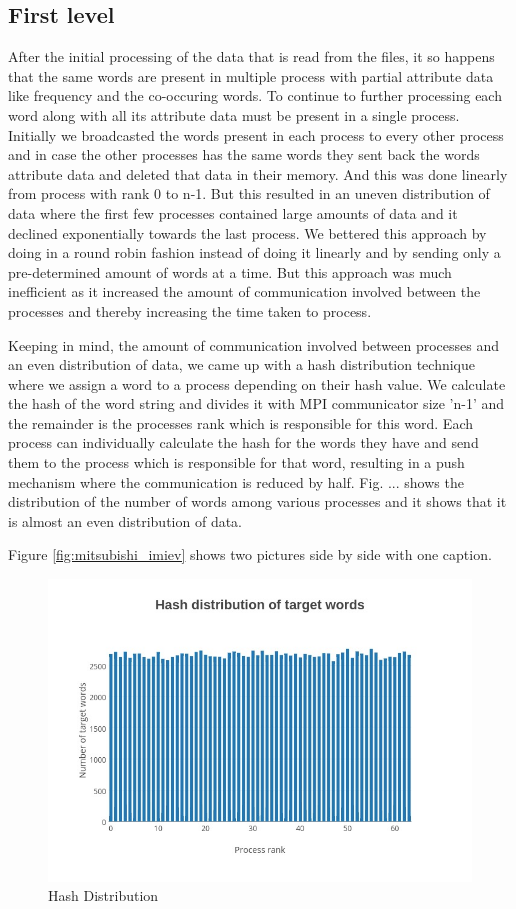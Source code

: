\documentclass[article,dr=phil,type=drfinal,colorback,accentcolor=tud9c]{tudthesis}
\begin{document}
\newpage
\subsection{First level}
After the initial processing of the data that is read from the files, it so happens that the same words are present in multiple process with partial attribute data like frequency and the co-occuring words. To continue to further processing each word along with all its attribute data must be present in a single process. Initially we broadcasted the words present in each process to every other process and in case the other processes has the same words they sent back the words attribute data and deleted that data in their memory. And this was done linearly from process with rank 0 to n-1. But this resulted in an uneven distribution of data where the first few processes contained large amounts of data and it declined exponentially towards the last process. We bettered this approach by doing in a round robin fashion instead of doing it linearly and by sending only a pre-determined amount of words at a time. But this approach was much inefficient as it increased the amount of communication involved between the processes and thereby increasing the time taken to process.

Keeping in mind, the amount of communication involved between processes and an even distribution of data, we came up with a hash distribution technique where we assign a word to a process depending on their hash value. We calculate the hash of the word string and divides it with MPI communicator size 'n-1' and the remainder is the processes rank which is responsible for this word. Each process can individually calculate the hash for the words they have and send them to the process which is responsible for that word, resulting in a push mechanism where the communication is reduced by half. Fig. ... shows the distribution of the number of words among various processes and it shows that it is almost an even distribution of data.

Figure \ref{fig:mitsubishi_imiev} shows two pictures side by side with one caption.

\begin{figure}[htb]
	\centering
	\includegraphics[width=150mm]{images/12}
	\caption[Hash Distribution]{Hash Distribution}
	\label{fig:hashdistribution}
\end{figure}
\end{document}
